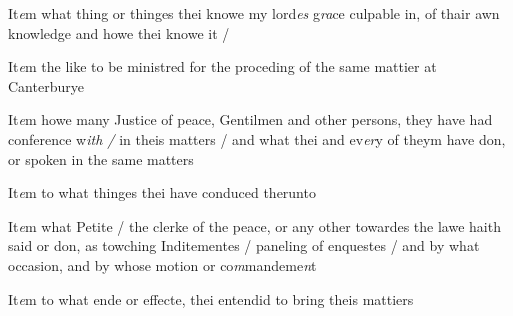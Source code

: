 \documentclass[12pt, a4paper]{book}
\begin{document}
            		
            		
            			
				\marginpar[\vspace{0.5cm}{\textcolor{Gray}{6}}]{}
			
            			
		\ifthenelse{\isodd{\thepage}}
		{\reversemarginpar}
		{\normalmarginpar}
		 It\textit{e}m what thing or thinges thei knowe my lord\textit{es} g\textit{ra}ce
 culpable in, of thair awn knowledge and howe
 thei knowe it /
            		

				\marginpar[\vspace{0.5cm}{\textcolor{Gray}{7}}]{}
			 
		\ifthenelse{\isodd{\thepage}}
		{\reversemarginpar}
		{\normalmarginpar}
		 It\textit{e}m the like to be ministred for the proceding of the
	same mattier at Canterburye
 

				\marginpar[\vspace{0.5cm}{\textcolor{Gray}{8}}]{}
			 
		\ifthenelse{\isodd{\thepage}}
		{\reversemarginpar}
		{\normalmarginpar}
		 It\textit{e}m howe many Justice of peace, Gentilmen and other
 persons, they have had conference w\textit{ith /} in theis matters /
 and what thei and ev\textit{er}y of theym have don, or spoken
 in the same matters
 

				\marginpar[\vspace{0.5cm}{\textcolor{Gray}{9}}]{}
			 
		\ifthenelse{\isodd{\thepage}}
		{\reversemarginpar}
		{\normalmarginpar}
		 It\textit{e}m to what thinges thei have conduced therunto
 

				\marginpar[\vspace{0.5cm}{\textcolor{Gray}{10}}]{}
			 
		\ifthenelse{\isodd{\thepage}}
		{\reversemarginpar}
		{\normalmarginpar}
		 It\textit{e}m what Petite / the clerke of the peace, or any
 other towardes the lawe haith said or don, as
 towching Inditementes / paneling of enquestes / and
 by what occasion, and by whose motion or co\textit{m}mandeme\textit{n}t
 

				\marginpar[\vspace{0.5cm}{\textcolor{Gray}{11}}]{}
			 
		\ifthenelse{\isodd{\thepage}}
		{\reversemarginpar}
		{\normalmarginpar}
		 It\textit{e}m to what ende or effecte, thei entendid to bring
 theis mattiers
 

				\marginpar[\vspace{0.5cm}{\textcolor{Gray}{12}}]{}
			 
\end{document}
